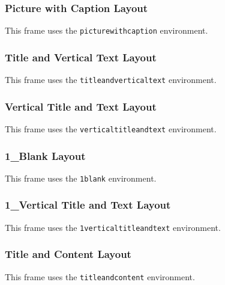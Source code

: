 \documentclass[11pt,aspectratio=169]{beamer}
\begin{document}
\begin{picturewithcaption}
  \begin{frame}
    \frametitle{Picture with Caption Layout}
    This frame uses the \texttt{picturewithcaption} environment.
  \end{frame}
\end{picturewithcaption}

\begin{titleandverticaltext}
  \begin{frame}
    \frametitle{Title and Vertical Text Layout}
    This frame uses the \texttt{titleandverticaltext} environment.
  \end{frame}
\end{titleandverticaltext}

\begin{verticaltitleandtext}
  \begin{frame}
    \frametitle{Vertical Title and Text Layout}
    This frame uses the \texttt{verticaltitleandtext} environment.
  \end{frame}
\end{verticaltitleandtext}

\begin{1blank}
  \begin{frame}
    \frametitle{1_Blank Layout}
    This frame uses the \texttt{1blank} environment.
  \end{frame}
\end{1blank}

\begin{1verticaltitleandtext}
  \begin{frame}
    \frametitle{1_Vertical Title and Text Layout}
    This frame uses the \texttt{1verticaltitleandtext} environment.
  \end{frame}
\end{1verticaltitleandtext}

\begin{titleandcontent}
  \begin{frame}
    \frametitle{Title and Content Layout}
    This frame uses the \texttt{titleandcontent} environment.
  \end{frame}
\end{titleandcontent}
\end{document}
